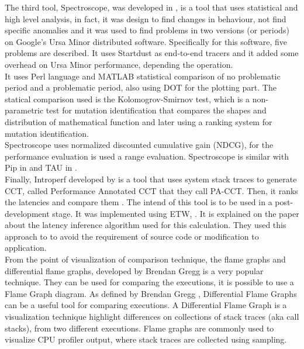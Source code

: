 The third tool, Spectroscope, was developed in \cite{Sambasivan2011DPC19724571972463}, is a tool that uses statistical and high level analysis, in fact, it was design to find changes in behaviour, not find specific anomalies and it was used to find problems in two versions (or periods) on Google's Ursa Minor distributed software. Specifically for this software, five problems are described. It uses Startdust as end-to-end tracers and it added some overhead on Ursa Minor performance, depending the operation. \\
It uses Perl language and MATLAB statistical comparison of no problematic period and a problematic period, also using DOT for the plotting part.
The statical comparison used is the Kolomogrov-Smirnov test,  which is a non-parametric test for mutation identification that compares the shapes and distribution of mathematical function and later using a ranking system for mutation identification.\\
 Spectroscope uses normalized discounted cumulative gain (NDCG), for the performance evaluation is used a range evaluation. Spectroscope is similar with Pip in \cite{Pip} and TAU in \cite{TAU}.\\
 
Finally, Introperf developed by \cite{Introperf} is a tool that uses system stack traces to generate CCT, called Performance Annotated CCT that they call PA-CCT. Then, it ranks the latencies and compare them \cite{Introperf}. The intend of this tool is to be used in a post-development stage. It was implemented using ETW, \cite{ETW}. It is explained on the paper about the latency inference algorithm used for this calculation. They used this approach to to avoid the requirement of source code or modification to application. \\

From the point of visualization of comparison technique, the flame graphs and differential flame graphs, developed by Brendan Gregg is a very popular technique. They can be used for comparing the executions, it is possible to use a Flame Graph diagram. As defined by Brendan Gregg \cite{differential_flame}, Differential Flame Graphs can be a useful tool for comparing executions. A Differential Flame Graph is a visualization technique highlight differences on collections of stack traces (aka call stacks), from two different executions. Flame graphs are commonly used to visualize CPU profiler output, where stack traces are collected using sampling.